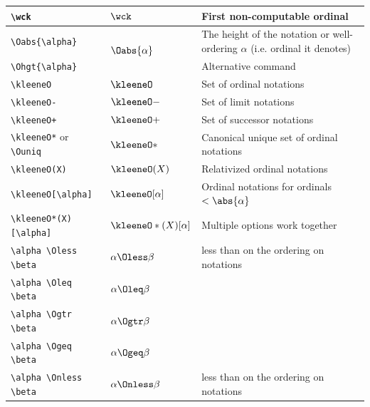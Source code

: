 \documentclass[leqno,11pt]{amsart}
\newcommand{\tab}{\hspace{1cm}}
\begin{document}
\begin{tabular}{l |  l | l}\toprule
	\verb=\wck=			        & \( 	\wck                      \)			       & First non-computable ordinal \\ \midrule
	\verb=\Oabs{\alpha}=			& \multirow{2}{*}{\( \Oabs{\alpha} \)}					& The height of the notation or well-ordering \( \alpha \) (i.e. ordinal it denotes) \\ 
	\tab \verb=\Ohgt{\alpha}= & & Alternative command \\ \midrule
	\verb=\kleeneO=                        & \( 	\kleeneO                   \)  & Set of ordinal notations \\
	\tab \verb=\kleeneO-=                        & \( 	\kleeneO-                   \)  & Set of limit notations \\
	\tab \verb=\kleeneO+=                        & \( 	\kleeneO+                   \)  & Set of successor notations \\
	\tab \verb=\kleeneO*= or   \verb=\Ouniq=    & \( 	\kleeneO*                  \)        & Canonical unique set of ordinal notations \\
	\tab \verb=\kleeneO(X)=                     & \( 	\kleeneO(X)                \)                          & Relativized ordinal notations \\
	\tab \verb=\kleeneO[\alpha]=                & \( 	\kleeneO[\alpha]  \)  & Ordinal notations for ordinals \( < \abs{\alpha} \)\\
	\tab \verb=\kleeneO*(X)[\alpha]=            & \( 	\kleeneO*(X)[\alpha]       \)  & Multiple options work together \\ \midrule
	\verb=\alpha \Oless \beta=        & \( 	\alpha \Oless \beta   \) & less than on the ordering on notations \\   
	\tab \verb=\alpha \Oleq  \beta=        & \( 	\alpha \Oleq  \beta   \) & \\ \midrule
	\tab \verb=\alpha \Ogtr  \beta=        & \( 	\alpha \Ogtr  \beta   \)                          & \\ 
	\tab \verb=\alpha \Ogeq  \beta=        & \( 	\alpha \Ogeq  \beta   \)                          & \\ 
	\tab \verb=\alpha \Onless \beta=        & \( 	\alpha \Onless \beta   \) & less than on the ordering on notations \\   

\end{tabular}
\end{document}
